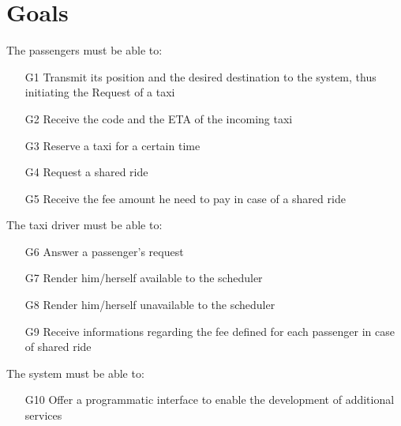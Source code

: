 \documentclass[a4paper,11pt]{report}
\begin{document}
\section{Goals}
The passengers must be able to:
\begin{itemize}
  \item [G1] Transmit its position and the desired destination to the system, thus initiating the Request of a taxi
  \item [G2] Receive the code and the ETA of the incoming taxi
  \item [G3] Reserve a taxi for a certain time  %
  \item [G4] Request a shared ride
  \item [G5] Receive the fee amount he need to pay in case of a shared ride
\end{itemize}
The taxi driver must be able to:
\begin{itemize}
  \item [G6] Answer a passenger's request
  \item [G7] Render him/herself available to the scheduler
  \item [G8] Render him/herself unavailable to the scheduler
  \item [G9] Receive informations regarding the fee defined for each passenger in case of shared ride
\end{itemize}
The system must be able to:
\begin{itemize}
  \item [G10] Offer a programmatic interface to enable the development of additional services
\end{itemize}
\end{document}
